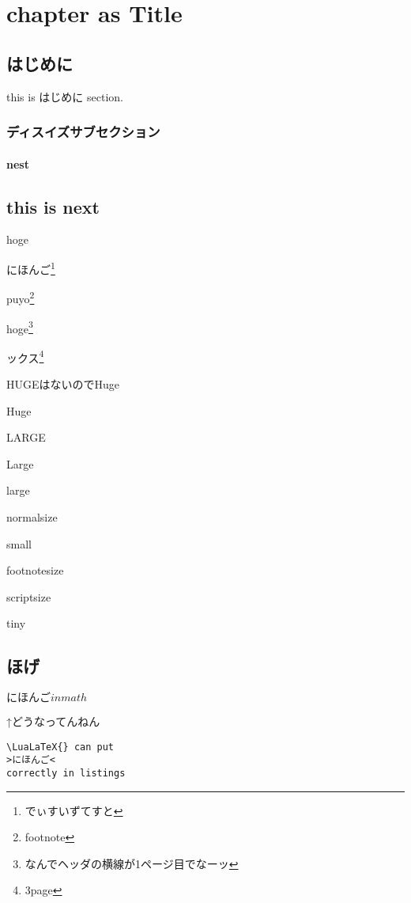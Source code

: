 \documentclass{word}
\author{WORD太郎}
\subtitle{subtitleだぴょん}
\begin{document}
\chapter{chapter as Title}

\section{はじめに}
this is はじめに section.

\subsection{ディスイズサブセクション}

\subsubsection{nest}

\section{this is next}

hoge

にほんご\footnote{でぃすいずてすと}

puyo\footnote{footnote}

hoge\footnote{なんでヘッダの横線が1ページ目でなーッ}

ックス\footnote{3page}

{\Huge HUGEはないのでHuge}

{\Huge Huge}

{\LARGE LARGE}

{\Large Large}

{\large large}

{\normalsize normalsize}

{\small small}

{\footnotesize footnotesize}

{\scriptsize scriptsize}

{\tiny tiny}

\newpage

\section{ほげ}

\newpage

$にほんごinmath$

\newpage
↑どうなってんねん

\lstset{language=TeX,numbers=left}
\begin{lstlisting}
\LuaLaTeX{} can put
>にほんご<
correctly in listings
\end{lstlisting}
\end{document}
